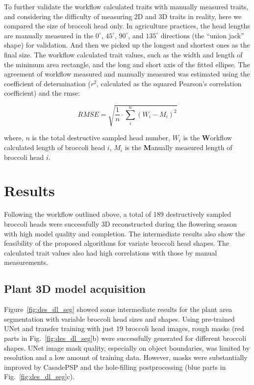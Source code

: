 To further validate the workflow calculated traits with manually measured traits, and considering the difficulty of measuring 2D and 3D traits in reality, here we compared the size of broccoli head only. In agriculture practices, the head lengths are manually measured in the $0^\circ$, $45^\circ$, $90^\circ$, and $135^\circ$ directions (the ``union jack'' shape) for validation. And then we picked up the longest and shortest ones as the final size. The workflow calculated trait values, such as the width and length of the minimum area rectangle, and the long and short axis of the fitted ellipse. The agreement of workflow measured and manually measured was estimated using the coefficient of determination ($r^2$, calculated as the squared Pearson's correlation coefficient) and the \gls{rmse}:

\begin{equation}
  RMSE = \sqrt{\frac{1}{n} \cdot \sum_{i}^{n} (W_{i} - M_{i})^2}
\end{equation}

\noindent
where, $n$ is the total destructive sampled head number, $W_{i}$ is the \textbf{W}orkflow calculated length of broccoli head $i$, $M_{i}$ is the \textbf{M}anually measured length of broccoli head $i$.

\section{Results}

Following the workflow outlined above, a total of 189 destructively sampled broccoli heads were successfully 3D reconstructed during the flowering season with high model quality and completion. The intermediate results also show the feasibility of the proposed algorithms for variate broccoli head shapes. The calculated trait values also had high correlations with those by manual measurements.

\subsection{Plant 3D model acquisition}

Figure~\ref{fig:des_dl_seg} showed some intermediate results for the plant area segmentation with variable broccoli head sizes and shapes. Using pre-trained UNet and transfer training with just 19 broccoli head images, rough masks (red parts in Fig.~\ref{fig:des_dl_seg}b) were successfully generated for different broccoli shapes. UNet image mask quality, especially on object boundaries, was limited by resolution and a low amount of training data. However, masks were substantially improved by CasadePSP and the hole-filling postprocessing (blue parts in Fig.~\ref{fig:des_dl_seg}c).

